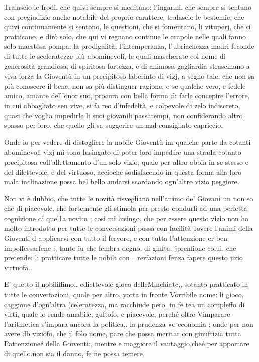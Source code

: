 \documentclass[12pt,a6paper]{article}
\begin{document}
Tralascio le frodi, che quivi
sempre si meditano; l'inganni,
che sempre si tentano con
pregiudizio anche notabile del
proprio carattere; tralascio
le bestemie, che quivi continuamente
si sentono, le questioni, che si
fomentano, li vituperj, che si
pratticano, e dirò solo, che qui
vi regnano continue le crapole
nelle quali fanno solo maestosa
pompa: la prodigalità, l'intemperanza,
l'ubriachezza madri
feconde di tutte le sceleratezze
più abominevoli, le quali mascherate
col nome di generosità
grandiosa, di spiritosa fortezza,
e di animosa gagliardia strascinano
a viva forza la Gioventù in
un precipitoso laberinto di vizj,
a segno tale, che non sa più conoscere
il bene, non sa più distinguer ragione, e se qualche
vero, e fedele amico, amante
dell’onor suo, procura con bella
forma di farle concepire l’errore,
in cui abbagliato sen vive,
si fa reo d’infedeltà, e colpevole
di zelo indiscreto, quasi che
voglia impedirle li suoi giovanili
passatempi, non confiderando
altro spasso per loro, che
quello gli sa suggerire un mal
consigliato capriccio.

Onde io per vedere di distogliere
la nobile Gioventù im
qualche parte da cotanti abominevoli
vizj mi sono lusingato
di poter loro impedire una
strada cotanto precipitosa
coll'allettamento d’un solo vizio,
quale per altro abbia in se stesso
e del dilettevole, e del virtuoso,
accioche sodisfacendo in questa
forma alla loro mala inclinazione
possa bel bello andarsi
scordando ogn’altro vizio
peggiore.

Non vi è dubbio, che tutte
le novità risvegliano nell'animo
de’ Giovani un non so che di 
piacevole, che fortemente gli
stimola per presto condurli ad
una perfetta cognizione di
quel1a novita ; cosi mi lusingo, che
per essere questo vizio non ha
molto introdotto per tutte le
conversazioni possa con facilità
1overe l’animi della Gioventi
d applicarvi con tutto il fervore,
e con tutta l'attenzione
er ben impoffessarfene ;, tanto
iu che fembra degno. di ginfta.
jprenfione colui, che pretende:
li pratticare tutte le nobilt con=
rerfazioni fenza fapere questo
jizio virtuofa..

E’ quetto il nobiliffimo., ediettevole gioco delleMinchiate,,
sotanto pratticato in tutte le
converfazioni, quale per altro,
yorta in fronte Vorribile nome:
li gioco, caggione d’ogn’altra
(celeratezza, ma racchiude pero. in fe tea un compleffo di
virti, quale lo rende amabile,
guftofo, ¢ piacevole, perché
oltre Vimparare l’aritmetica
s'impara ancora la politica,. la
prudenza »e economia ; onde
per non avere db viziofo, che jl
folo nome, pare che possa meritar con ginuftizia tutta Pattenzioneé della Gioventi:, mentre
e maggiore il vantaggio,cheé
per apportare di quello.non sia
il danno, fe ne possa temere,
\end{document}
